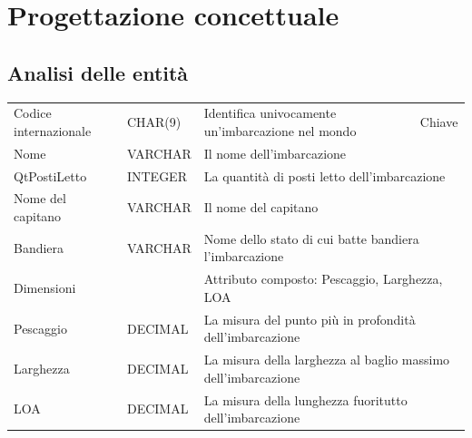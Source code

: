 \section{Progettazione concettuale}

\subsection{Analisi delle entità}

\begin{center}
    \begin{tabularx}{\textwidth}{|l|l|l|X|}
        \hline
        \rowcolor{gray!30}
        \multicolumn{4}{|c|}{\textbf{Imbarcazione}}\\
        \hline
        Codice internazionale & CHAR(9) & Identifica univocamente un'imbarcazione nel mondo & Chiave\\
        \hline
        Nome & VARCHAR & \multicolumn{2}{l|}{Il nome dell'imbarcazione} \\
        \hline
        QtPostiLetto & INTEGER & \multicolumn{2}{l|}{La quantità di posti letto dell'imbarcazione} \\
        \hline
        Nome del capitano & VARCHAR & \multicolumn{2}{l|}{Il nome del capitano} \\
        \hline
        Bandiera & VARCHAR & \multicolumn{2}{l|}{Nome dello stato di cui batte bandiera l'imbarcazione} \\
        \hline
        Dimensioni &  & \multicolumn{2}{l|}{Attributo composto: Pescaggio, Larghezza, LOA} \\
        \hline
        Pescaggio & DECIMAL & \multicolumn{2}{l|}{La misura del punto più in profondità dell'imbarcazione} \\
        \hline
        Larghezza & DECIMAL & \multicolumn{2}{l|}{La misura della larghezza al baglio massimo dell'imbarcazione} \\
        \hline
        LOA & DECIMAL & \multicolumn{2}{l|}{La misura della lunghezza fuoritutto dell'imbarcazione} \\
        \hline
    \end{tabularx}
\end{center}

